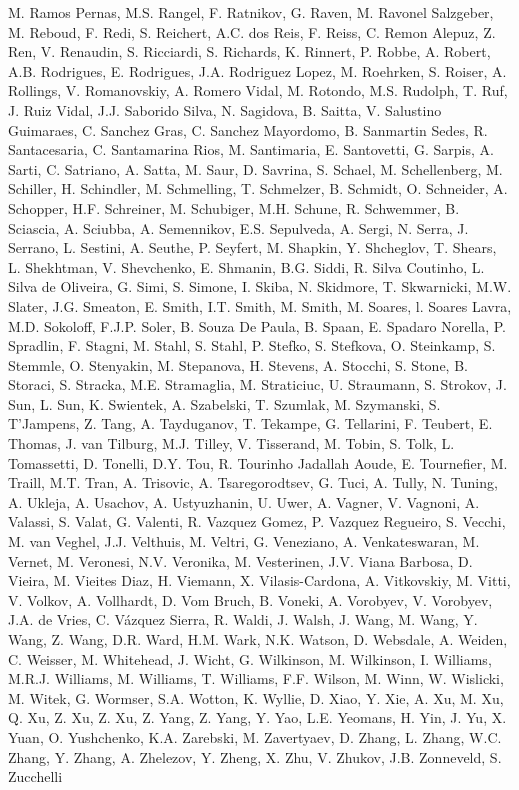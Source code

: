 M. Ramos Pernas,
M.S. Rangel,
F. Ratnikov,
G. Raven,
M. Ravonel Salzgeber,
M. Reboud,
F. Redi,
S. Reichert,
A.C. dos Reis,
F. Reiss,
C. Remon Alepuz,
Z. Ren,
V. Renaudin,
S. Ricciardi,
S. Richards,
K. Rinnert,
P. Robbe,
A. Robert,
A.B. Rodrigues,
E. Rodrigues,
J.A. Rodriguez Lopez,
M. Roehrken,
S. Roiser,
A. Rollings,
V. Romanovskiy,
A. Romero Vidal,
M. Rotondo,
M.S. Rudolph,
T. Ruf,
J. Ruiz Vidal,
J.J. Saborido Silva,
N. Sagidova,
B. Saitta,
V. Salustino Guimaraes,
C. Sanchez Gras,
C. Sanchez Mayordomo,
B. Sanmartin Sedes,
R. Santacesaria,
C. Santamarina Rios,
M. Santimaria,
E. Santovetti,
G. Sarpis,
A. Sarti,
C. Satriano,
A. Satta,
M. Saur,
D. Savrina,
S. Schael,
M. Schellenberg,
M. Schiller,
H. Schindler,
M. Schmelling,
T. Schmelzer,
B. Schmidt,
O. Schneider,
A. Schopper,
H.F. Schreiner,
M. Schubiger,
M.H. Schune,
R. Schwemmer,
B. Sciascia,
A. Sciubba,
A. Semennikov,
E.S. Sepulveda,
A. Sergi,
N. Serra,
J. Serrano,
L. Sestini,
A. Seuthe,
P. Seyfert,
M. Shapkin,
Y. Shcheglov,
T. Shears,
L. Shekhtman,
V. Shevchenko,
E. Shmanin,
B.G. Siddi,
R. Silva Coutinho,
L. Silva de Oliveira,
G. Simi,
S. Simone,
I. Skiba,
N. Skidmore,
T. Skwarnicki,
M.W. Slater,
J.G. Smeaton,
E. Smith,
I.T. Smith,
M. Smith,
M. Soares,
l. Soares Lavra,
M.D. Sokoloff,
F.J.P. Soler,
B. Souza De Paula,
B. Spaan,
E. Spadaro Norella,
P. Spradlin,
F. Stagni,
M. Stahl,
S. Stahl,
P. Stefko,
S. Stefkova,
O. Steinkamp,
S. Stemmle,
O. Stenyakin,
M. Stepanova,
H. Stevens,
A. Stocchi,
S. Stone,
B. Storaci,
S. Stracka,
M.E. Stramaglia,
M. Straticiuc,
U. Straumann,
S. Strokov,
J. Sun,
L. Sun,
K. Swientek,
A. Szabelski,
T. Szumlak,
M. Szymanski,
S. T'Jampens,
Z. Tang,
A. Tayduganov,
T. Tekampe,
G. Tellarini,
F. Teubert,
E. Thomas,
J. van Tilburg,
M.J. Tilley,
V. Tisserand,
M. Tobin,
S. Tolk,
L. Tomassetti,
D. Tonelli,
D.Y. Tou,
R. Tourinho Jadallah Aoude,
E. Tournefier,
M. Traill,
M.T. Tran,
A. Trisovic,
A. Tsaregorodtsev,
G. Tuci,
A. Tully,
N. Tuning,
A. Ukleja,
A. Usachov,
A. Ustyuzhanin,
U. Uwer,
A. Vagner,
V. Vagnoni,
A. Valassi,
S. Valat,
G. Valenti,
R. Vazquez Gomez,
P. Vazquez Regueiro,
S. Vecchi,
M. van Veghel,
J.J. Velthuis,
M. Veltri,
G. Veneziano,
A. Venkateswaran,
M. Vernet,
M. Veronesi,
N.V. Veronika,
M. Vesterinen,
J.V. Viana Barbosa,
D.  Vieira,
M. Vieites Diaz,
H. Viemann,
X. Vilasis-Cardona,
A. Vitkovskiy,
M. Vitti,
V. Volkov,
A. Vollhardt,
D. Vom Bruch,
B. Voneki,
A. Vorobyev,
V. Vorobyev,
J.A. de Vries,
C. V{\'a}zquez Sierra,
R. Waldi,
J. Walsh,
J. Wang,
M. Wang,
Y. Wang,
Z. Wang,
D.R. Ward,
H.M. Wark,
N.K. Watson,
D. Websdale,
A. Weiden,
C. Weisser,
M. Whitehead,
J. Wicht,
G. Wilkinson,
M. Wilkinson,
I. Williams,
M.R.J. Williams,
M. Williams,
T. Williams,
F.F. Wilson,
M. Winn,
W. Wislicki,
M. Witek,
G. Wormser,
S.A. Wotton,
K. Wyllie,
D. Xiao,
Y. Xie,
A. Xu,
M. Xu,
Q. Xu,
Z. Xu,
Z. Xu,
Z. Yang,
Z. Yang,
Y. Yao,
L.E. Yeomans,
H. Yin,
J. Yu,
X. Yuan,
O. Yushchenko,
K.A. Zarebski,
M. Zavertyaev,
D. Zhang,
L. Zhang,
W.C. Zhang,
Y. Zhang,
A. Zhelezov,
Y. Zheng,
X. Zhu,
V. Zhukov,
J.B. Zonneveld,
S. Zucchelli
